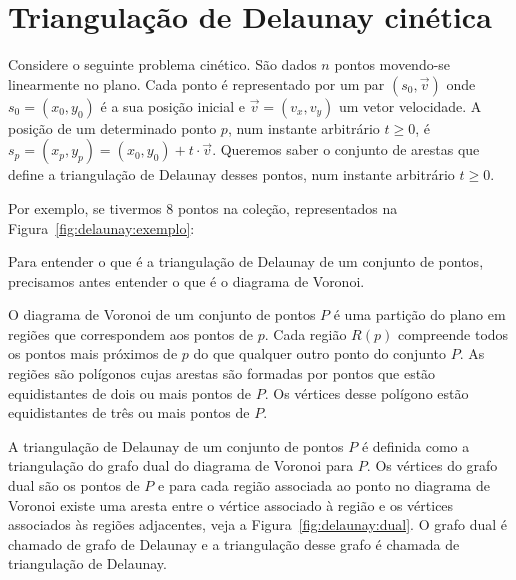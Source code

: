 

\chapter{Triangulação de Delaunay cinética}\label{ch:triangulacao-de-delaunay-cinetica}


Considere o seguinte problema cinético.
São dados $n$ pontos movendo-se linearmente no plano.
Cada ponto é representado por um par $(s_0, \vec{v})$ onde $s_0 = (x_0, y_0)$ é a sua posição
inicial e $\vec{v} = (v_x, v_y)$ um vetor velocidade.
A posição de um determinado ponto $p$, num instante arbitrário $t \geq 0$, é
$s_p = (x_p, y_p) = (x_0, y_0)+t\cdot \vec{v}$.
Queremos saber o conjunto de arestas que define a triangulação de Delaunay desses pontos, num
instante arbitrário $t \geq 0$.

Por exemplo, se tivermos 8 pontos na coleção, representados na Figura~\ref{fig:delaunay:exemplo}:



Para entender o que é a triangulação de Delaunay de um conjunto de pontos, precisamos antes
entender o que é o diagrama de Voronoi.

O diagrama de Voronoi de um conjunto de pontos $P$ é uma partição do plano em regiões que
correspondem aos pontos de $p$.
Cada região $R(p)$ compreende todos os pontos mais próximos de $p$ do que qualquer outro ponto do conjunto $P$.
As regiões são polígonos cujas arestas são formadas por pontos que estão equidistantes de dois ou
mais pontos de $P$.
Os vértices desse polígono estão equidistantes de três ou mais pontos de $P$.

A triangulação de Delaunay de um conjunto de pontos $P$ é definida como a triangulação do grafo
dual do diagrama de Voronoi para $P$.
Os vértices do grafo dual são os pontos de $P$ e para cada região associada ao ponto no diagrama de
Voronoi existe uma aresta entre o vértice associado à região e os vértices associados às regiões
adjacentes, veja a Figura~\ref{fig:delaunay:dual}.
O grafo dual é chamado de grafo de Delaunay e a triangulação desse grafo é chamada de triangulação
de Delaunay.

